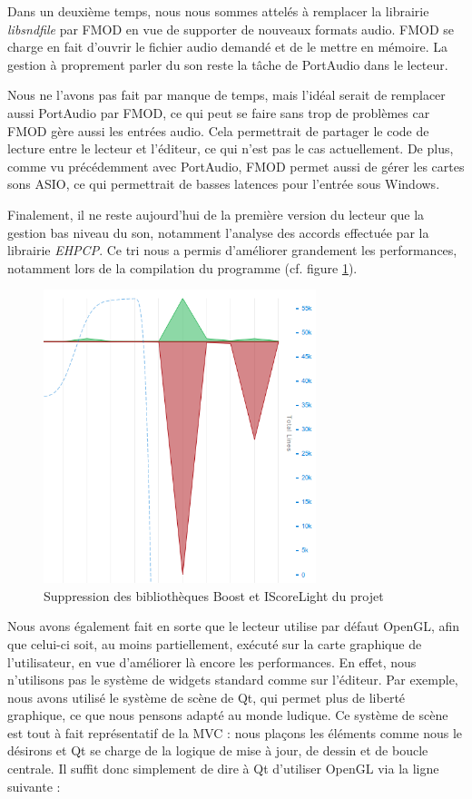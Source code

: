 Dans un deuxième temps, nous nous sommes attelés à remplacer la librairie \textit{libsndfile} par FMOD en vue de supporter de nouveaux formats audio. FMOD se charge en fait d'ouvrir le fichier audio demandé et de le mettre en mémoire. La gestion à proprement parler du son reste la tâche de PortAudio dans le lecteur.

Nous ne l'avons pas fait par manque de temps, mais l'idéal serait de remplacer aussi PortAudio par FMOD,
 ce qui peut se faire sans trop de problèmes car FMOD gère aussi les entrées audio.
 Cela permettrait de partager le code de lecture entre le lecteur et l'éditeur, ce qui n'est pas le cas actuellement.
 De plus, comme vu précédemment avec PortAudio, FMOD permet aussi de gérer les cartes sons ASIO, ce qui permettrait de basses
 latences pour l'entrée sous Windows.

Finalement, il ne reste aujourd'hui de la première version du lecteur que la gestion bas niveau du son, notamment l'analyse des accords effectuée par la librairie \textit{EHPCP}. Ce tri nous a permis d'améliorer grandement les performances, notamment lors de la compilation du programme (cf. figure \ref{refonte_code}).

\begin{figure}[H]
\begin{center}
\includegraphics[width=300px]{refonte_code.png}
\caption{Suppression des bibliothèques Boost et IScoreLight du projet}
\label{refonte_code}
\end{center}
\end{figure}

Nous avons également fait en sorte que le lecteur utilise par défaut OpenGL, afin que celui-ci soit, au moins partiellement, exécuté sur la carte graphique de l'utilisateur, en vue d'améliorer là encore les performances. En effet, nous n'utilisons pas le système de widgets standard comme sur l'éditeur. Par exemple, nous avons utilisé le système de scène de Qt, qui permet plus de liberté graphique, ce que nous pensons adapté au monde ludique.
Ce système de scène est tout à fait représentatif de la \ac{MVC} : nous plaçons les éléments comme nous le désirons et Qt se charge
de la logique de mise à jour, de dessin et de boucle centrale. Il suffit donc simplement de dire à Qt d'utiliser OpenGL via la ligne suivante :

